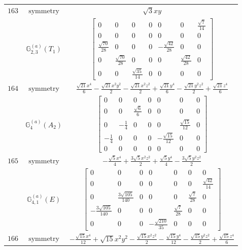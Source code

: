 \documentclass[fleqn,8pt,landscape]{jsarticle}
\begin{document}
\begin{longtable}{ccc}
$ 163 $ & $ \text{symmetry} $ & $ \sqrt{3} x y $ \\
$  $ & $ \mathbb{G}_{2,3}^{(a)}(T_{1}) $ & $ \begin{bmatrix} 0 & 0 & 0 & 0 & 0 & 0 & \frac{\sqrt{7}}{14} \\ 0 & 0 & 0 & 0 & 0 & 0 & 0 \\ \frac{\sqrt{70}}{28} & 0 & 0 & 0 & - \frac{\sqrt{42}}{28} & 0 & 0 \\ 0 & \frac{\sqrt{70}}{28} & 0 & 0 & 0 & \frac{\sqrt{42}}{28} & 0 \\ 0 & 0 & \frac{\sqrt{35}}{14} & 0 & 0 & 0 & 0 \end{bmatrix} $ \\ \hline
$ 164 $ & $ \text{symmetry} $ & $ \frac{\sqrt{21} x^{4}}{6} - \frac{\sqrt{21} x^{2} y^{2}}{2} - \frac{\sqrt{21} x^{2} z^{2}}{2} + \frac{\sqrt{21} y^{4}}{6} - \frac{\sqrt{21} y^{2} z^{2}}{2} + \frac{\sqrt{21} z^{4}}{6} $ \\
$  $ & $ \mathbb{G}_{4}^{(a)}(A_{2}) $ & $ \begin{bmatrix} 0 & 0 & 0 & 0 & 0 & 0 & 0 \\ 0 & 0 & \frac{\sqrt{6}}{6} & 0 & 0 & 0 & 0 \\ 0 & - \frac{1}{4} & 0 & 0 & 0 & \frac{\sqrt{15}}{12} & 0 \\ - \frac{1}{4} & 0 & 0 & 0 & - \frac{\sqrt{15}}{12} & 0 & 0 \\ 0 & 0 & 0 & 0 & 0 & 0 & 0 \end{bmatrix} $ \\ \hline
$ 165 $ & $ \text{symmetry} $ & $ - \frac{\sqrt{5} x^{4}}{4} + \frac{3 \sqrt{5} x^{2} z^{2}}{2} + \frac{\sqrt{5} y^{4}}{4} - \frac{3 \sqrt{5} y^{2} z^{2}}{2} $ \\
$  $ & $ \mathbb{G}_{4,1}^{(a)}(E) $ & $ \begin{bmatrix} 0 & 0 & 0 & 0 & 0 & 0 & 0 \\ 0 & 0 & 0 & 0 & 0 & 0 & \frac{\sqrt{42}}{14} \\ 0 & \frac{3 \sqrt{105}}{140} & 0 & 0 & 0 & \frac{\sqrt{7}}{28} & 0 \\ - \frac{3 \sqrt{105}}{140} & 0 & 0 & 0 & \frac{\sqrt{7}}{28} & 0 & 0 \\ 0 & 0 & 0 & - \frac{\sqrt{210}}{35} & 0 & 0 & 0 \end{bmatrix} $ \\ \hline
$ 166 $ & $ \text{symmetry} $ & $ - \frac{\sqrt{15} x^{4}}{12} + \sqrt{15} x^{2} y^{2} - \frac{\sqrt{15} x^{2} z^{2}}{2} - \frac{\sqrt{15} y^{4}}{12} - \frac{\sqrt{15} y^{2} z^{2}}{2} + \frac{\sqrt{15} z^{4}}{6} $ \\

\end{longtable}
\end{document}
